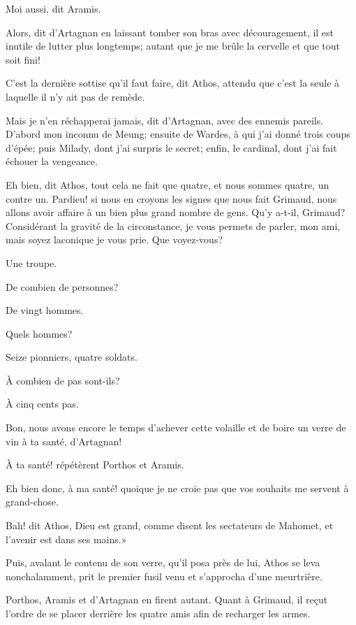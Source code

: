 \speak  Moi aussi, dit Aramis. 

\speak  Alors, dit d'Artagnan en laissant tomber son bras avec découragement, il est inutile de lutter plus longtemps; autant que je me brûle la cervelle et que tout soit fini! 

\speak  C'est la dernière sottise qu'il faut faire, dit Athos, attendu que c'est la seule à laquelle il n'y ait pas de remède. 

\speak  Mais je n'en réchapperai jamais, dit d'Artagnan, avec des ennemis pareils. D'abord mon inconnu de Meung; ensuite de Wardes, à qui j'ai donné trois coups d'épée; puis Milady, dont j'ai surpris le secret; enfin, le cardinal, dont j'ai fait échouer la vengeance. 

\speak  Eh bien, dit Athos, tout cela ne fait que quatre, et nous sommes quatre, un contre un. Pardieu! si nous en croyons les signes que nous fait Grimaud, nous allons avoir affaire à un bien plus grand nombre de gens. Qu'y a-t-il, Grimaud? Considérant la gravité de la circonstance, je vous permets de parler, mon ami, mais soyez laconique je vous prie. Que voyez-vous? 

\speak  Une troupe. 

\speak  De combien de personnes? 

\speak  De vingt hommes. 

\speak  Quels hommes? 

\speak  Seize pionniers, quatre soldats. 

\speak  À combien de pas sont-ils? 

\speak  À cinq cents pas. 

\speak  Bon, nous avons encore le temps d'achever cette volaille et de boire un verre de vin à ta santé, d'Artagnan! 

\speak  À ta santé! répétèrent Porthos et Aramis. 

\speak  Eh bien donc, à ma santé! quoique je ne croie pas que vos souhaits me servent à grand-chose. 

\speak  Bah! dit Athos, Dieu est grand, comme disent les sectateurs de Mahomet, et l'avenir est dans ses mains.» 

Puis, avalant le contenu de son verre, qu'il posa près de lui, Athos se leva nonchalamment, prit le premier fusil venu et s'approcha d'une meurtrière. 

Porthos, Aramis et d'Artagnan en firent autant. Quant à Grimaud, il reçut l'ordre de se placer derrière les quatre amis afin de recharger les armes. 

